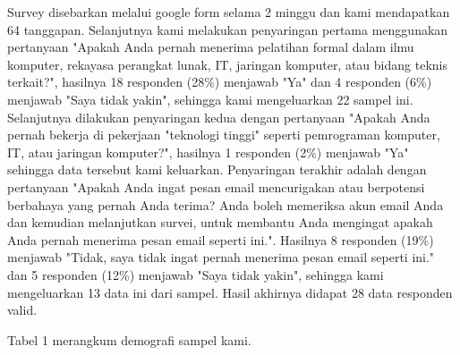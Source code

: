 \documentclass[lettersize,journal]{IEEEtran}
\begin{document}
Survey disebarkan melalui google form selama 2 minggu dan kami mendapatkan 64 tanggapan.
Selanjutnya kami melakukan penyaringan pertama menggunakan pertanyaan 
"Apakah Anda pernah menerima pelatihan formal dalam ilmu komputer, rekayasa perangkat lunak, IT, jaringan komputer, atau bidang teknis terkait?", 
hasilnya 18 responden (28\%) menjawab "Ya" dan 4 responden (6\%) menjawab "Saya tidak yakin", sehingga kami mengeluarkan 22 sampel ini. Selanjutnya 
dilakukan penyaringan kedua dengan pertanyaan "Apakah Anda pernah bekerja di pekerjaan "teknologi tinggi" seperti pemrograman komputer, IT, atau jaringan komputer?", 
hasilnya 1 responden (2\%) menjawab "Ya" sehingga data tersebut kami keluarkan.
Penyaringan terakhir adalah dengan pertanyaan "Apakah Anda ingat pesan email 
mencurigakan atau berpotensi berbahaya yang pernah Anda terima? Anda boleh memeriksa 
akun email Anda dan kemudian melanjutkan survei, untuk membantu Anda mengingat 
apakah Anda pernah menerima pesan email seperti ini.". Hasilnya 8 responden (19\%) menjawab "Tidak, saya tidak ingat pernah menerima pesan email seperti ini." dan 
5 responden (12\%) menjawab "Saya tidak yakin", sehingga kami mengeluarkan 13 data ini dari sampel. Hasil akhirnya didapat 28 data responden valid.

Tabel 1 merangkum demografi sampel kami.
\end{document}
